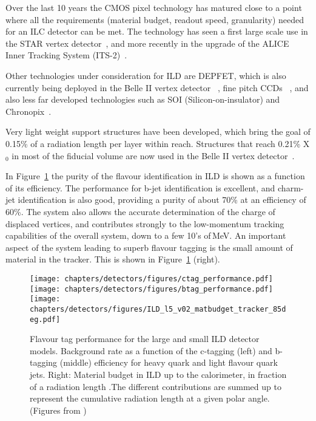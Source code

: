 Over the last 10 years the CMOS pixel technology has matured close to a point where all the requirements (material budget, readout speed, granularity) needed for an ILC detector can be met. The technology has seen a first large scale use in the STAR vertex detector~\cite{ild:bib:VTXcps3}, and more recently in the upgrade of the ALICE {Inner Tracking System (ITS-2)}~\cite{ALICE:2013nwm}. 

Other technologies under consideration for ILD are DEPFET, which is also currently being deployed in the Belle II vertex detector ~\cite{Luetticke:2017zpx}, fine pitch CCDs ~\cite{fineCCD}, and also less far developed technologies such as SOI (Silicon-on-insulator) and Chronopix~\cite{RDliaision}.

Very light weight support structures have been developed, which bring the goal of 0.15\% of a radiation length per layer within reach.  Structures {that reach 0.21\% X$_0$ in most of the fiducial volume} are now used in the Belle II vertex detector~\cite{PLUME:2011rwc}. 

In Figure~\ref{fig-btag} the purity of the flavour identification in ILD is shown as a function of its efficiency.
The performance for b-jet identification is excellent, and charm-jet identification is also good, providing a purity of about 70\% at an efficiency of 60\%.
 The system also allows the accurate determination of the charge of displaced vertices, and contributes strongly to the low-momentum tracking capabilities of the overall system, down to a few 10's of\,MeV. An important aspect of the system leading to superb flavour tagging is the small amount of material in the tracker. This is shown in Figure~\ref{fig-btag} (right).
\begin{figure}
    \centering
    \texttt{[image: chapters/detectors/figures/ctag\_performance.pdf]}
    \texttt{[image: chapters/detectors/figures/btag\_performance.pdf]}
    \texttt{[image: chapters/detectors/figures/ILD\_l5\_v02\_matbudget\_tracker\_85deg.pdf]}
    \caption{Flavour tag performance for the large and small ILD detector models.
    Background rate as a function of the c-tagging (left) and b-tagging (middle) efficiency
  for heavy quark and light flavour quark jets.
  Right: Material budget in ILD up to the calorimeter, in fraction of a radiation length .The different contributions are summed up to represent the cumulative radiation length at a given polar angle.(Figures from \cite{ILDConceptGroup:2020sfq})}
    \label{fig-btag}
\end{figure}  

